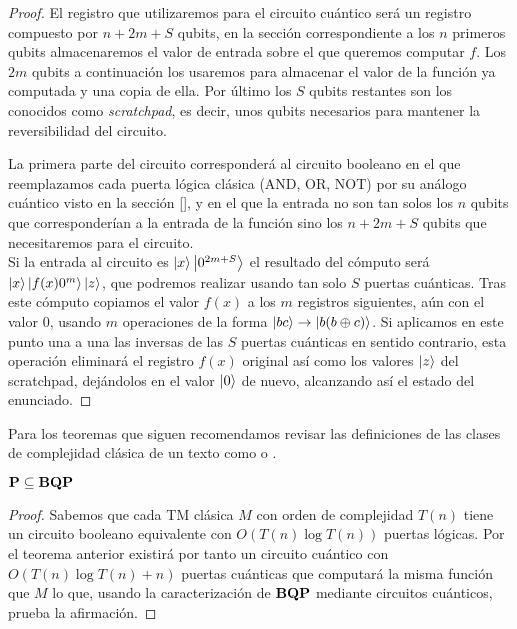 \begin{proof}
El registro que utilizaremos para el circuito cuántico será un registro compuesto por $n+2m+S$ qubits, en la sección correspondiente a los $n$ primeros qubits almacenaremos el valor de entrada sobre el que queremos computar $f$. Los $2m$ qubits a continuación los usaremos para almacenar el valor de la función ya computada y una copia\footnotemark{} de ella. Por último los $S$ qubits restantes son los conocidos como \emph{scratchpad}, es decir, unos qubits necesarios para mantener la reversibilidad del circuito.\\


La primera parte del circuito corresponderá al circuito booleano en el que reemplazamos cada puerta lógica clásica (AND, OR, NOT) por su análogo cuántico visto en la sección \ref{}, y en el que la entrada no son tan solos los $n$ qubits que corresponderían a la entrada de la función sino los $n+2m+S$ qubits que necesitaremos para el circuito.\\

Si la entrada al circuito es $\ket{x}\ket{0^{2m+S}}$ el resultado del cómputo será $\ket{x}\ket{f(x)0^m}\ket{z}$, que podremos realizar usando tan solo $S$ puertas cuánticas. Tras este cómputo copiamos el valor $f(x)$ a los $m$ registros siguientes, aún con el valor $0$, usando $m$ operaciones de la forma $\ket{bc}\rightarrow\ket{b(b\oplus c)}$. Si aplicamos en este punto una a una las inversas de las $S$ puertas cuánticas en sentido contrario, esta operación eliminará el registro $f(x)$ original así como los valores $\ket{z}$ del scratchpad, dejándolos en el valor $\ket{0}$ de nuevo, alcanzando así el estado del enunciado.
\end{proof}

Para los teoremas que siguen recomendamos revisar las definiciones de las clases de complejidad clásica de un texto como \cite{papadimitriou2003computational} o \cite{sipser2006introduction}.\\

\begin{corol} $\operatorname{\mathbf{P}}\subseteq \operatorname{\mathbf{BQP}}$
\end{corol}


\begin{proof}

Sabemos que cada TM clásica $M$ con orden de complejidad $T(n)$ tiene un circuito booleano equivalente con $O(T(n)\log T(n))$ puertas lógicas. Por el teorema anterior existirá por tanto un circuito cuántico con $O(T(n)\log T(n) + n)$ puertas cuánticas que computará la misma función que $M$ lo que, usando la caracterización de $\operatorname{\mathbf{BQP}}$ mediante circuitos cuánticos, prueba la afirmación.
\end{proof}

